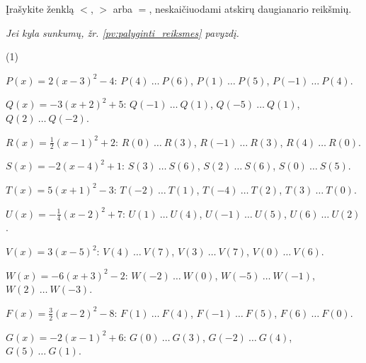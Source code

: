 \documentclass[11pt,a4paper]{scrartcl}
\makeatletter
\numberwithin{exercise}{section}
\renewenvironment{exercise}{\@thm{\th@definition}{exercise}{}}{\@endtheorem}
\newcommand{\pagalba}[1]{{\small\itshape Jei kyla sunkumų, žr. \ref{#1} pavyzdį.}}
\makeatother
\begin{document}
\begin{exercise}\label{uz:palyginti_reiksmes}
Įrašykite ženklą $<$, $>$ arba $=$, neskaičiuodami atskirų daugianario reikšmių.

\par\pagalba{pv:palyginti_reiksmes}

\begin{tasks}[label=(\arabic*),label-width=2em](1)

\task $P(x)=2(x-3)^2-4$: \quad $P(4)\ \ldots\ P(6)$, \quad $P(1)\ \ldots\ P(5)$, \quad $P(-1)\ \ldots\ P(4)$.

\task $Q(x)=-3(x+2)^2+5$: \quad $Q(-1)\ \ldots\ Q(1)$, \quad $Q(-5)\ \ldots\ Q(1)$, \quad $Q(2)\ \ldots\ Q(-2)$.

\task $R(x)=\frac12(x-1)^2+2$: \quad $R(0)\ \ldots\ R(3)$, \quad $R(-1)\ \ldots\ R(3)$, \quad $R(4)\ \ldots\ R(0)$.

\task $S(x)=-2(x-4)^2+1$: \quad $S(3)\ \ldots\ S(6)$, \quad $S(2)\ \ldots\ S(6)$, \quad $S(0)\ \ldots\ S(5)$.

\task $T(x)=5(x+1)^2-3$: \quad $T(-2)\ \ldots\ T(1)$, \quad $T(-4)\ \ldots\ T(2)$, \quad $T(3)\ \ldots\ T(0)$.

\task $U(x)=-\frac14(x-2)^2+7$: \quad $U(1)\ \ldots\ U(4)$, \quad $U(-1)\ \ldots\ U(5)$, \quad $U(6)\ \ldots\ U(2)$.

\task $V(x)=3(x-5)^2$: \quad $V(4)\ \ldots\ V(7)$, \quad $V(3)\ \ldots\ V(7)$, \quad $V(0)\ \ldots\ V(6)$.

\task $W(x)=-6(x+3)^2-2$: \quad $W(-2)\ \ldots\ W(0)$, \quad $W(-5)\ \ldots\ W(-1)$, \quad $W(2)\ \ldots\ W(-3)$.

\task $F(x)=\frac32(x-2)^2-8$: \quad $F(1)\ \ldots\ F(4)$, \quad $F(-1)\ \ldots\ F(5)$, \quad $F(6)\ \ldots\ F(0)$.

\task $G(x)=-2(x-1)^2+6$: \quad $G(0)\ \ldots\ G(3)$, \quad $G(-2)\ \ldots\ G(4)$, \quad $G(5)\ \ldots\ G(1)$.

\end{tasks}
\end{exercise}
\end{document}
